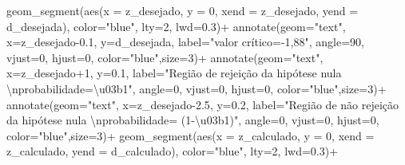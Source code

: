 \documentclass[
]{book}
\newenvironment{Shaded}{\begin{snugshade}}{\end{snugshade}}
\newcommand{\AttributeTok}[1]{\textcolor[rgb]{0.77,0.63,0.00}{#1}}
\newcommand{\DecValTok}[1]{\textcolor[rgb]{0.00,0.00,0.81}{#1}}
\newcommand{\FloatTok}[1]{\textcolor[rgb]{0.00,0.00,0.81}{#1}}
\newcommand{\FunctionTok}[1]{\textcolor[rgb]{0.00,0.00,0.00}{#1}}
\newcommand{\NormalTok}[1]{#1}
\newcommand{\SpecialCharTok}[1]{\textcolor[rgb]{0.00,0.00,0.00}{#1}}
\newcommand{\StringTok}[1]{\textcolor[rgb]{0.31,0.60,0.02}{#1}}
\begin{document}
\begin{Shaded}
\begin{Highlighting}[]
\FunctionTok{geom\_segment}\NormalTok{(}\FunctionTok{aes}\NormalTok{(}\AttributeTok{x =}\NormalTok{ z\_desejado, }\AttributeTok{y =} \DecValTok{0}\NormalTok{, }\AttributeTok{xend =}\NormalTok{ z\_desejado, }\AttributeTok{yend =}\NormalTok{ d\_desejada), }\AttributeTok{color=}\StringTok{"blue"}\NormalTok{, }\AttributeTok{lty=}\DecValTok{2}\NormalTok{, }\AttributeTok{lwd=}\FloatTok{0.3}\NormalTok{)}\SpecialCharTok{+}
\FunctionTok{annotate}\NormalTok{(}\AttributeTok{geom=}\StringTok{"text"}\NormalTok{, }\AttributeTok{x=}\NormalTok{z\_desejado}\FloatTok{{-}0.1}\NormalTok{, }\AttributeTok{y=}\NormalTok{d\_desejada, }\AttributeTok{label=}\StringTok{"valor crítico={-}1,88"}\NormalTok{, }\AttributeTok{angle=}\DecValTok{90}\NormalTok{, }\AttributeTok{vjust=}\DecValTok{0}\NormalTok{, }\AttributeTok{hjust=}\DecValTok{0}\NormalTok{, }\AttributeTok{color=}\StringTok{"blue"}\NormalTok{,}\AttributeTok{size=}\DecValTok{3}\NormalTok{)}\SpecialCharTok{+}
\FunctionTok{annotate}\NormalTok{(}\AttributeTok{geom=}\StringTok{"text"}\NormalTok{, }\AttributeTok{x=}\NormalTok{z\_desejado}\SpecialCharTok{+}\DecValTok{1}\NormalTok{, }\AttributeTok{y=}\FloatTok{0.1}\NormalTok{, }\AttributeTok{label=}\StringTok{"Região de rejeição da hipótese nula }\SpecialCharTok{\textbackslash{}n}\StringTok{probabilidade=\textbackslash{}u03b1"}\NormalTok{, }\AttributeTok{angle=}\DecValTok{0}\NormalTok{, }\AttributeTok{vjust=}\DecValTok{0}\NormalTok{, }\AttributeTok{hjust=}\DecValTok{0}\NormalTok{, }\AttributeTok{color=}\StringTok{"blue"}\NormalTok{,}\AttributeTok{size=}\DecValTok{3}\NormalTok{)}\SpecialCharTok{+}
\FunctionTok{annotate}\NormalTok{(}\AttributeTok{geom=}\StringTok{"text"}\NormalTok{, }\AttributeTok{x=}\NormalTok{z\_desejado}\FloatTok{{-}2.5}\NormalTok{, }\AttributeTok{y=}\FloatTok{0.2}\NormalTok{, }\AttributeTok{label=}\StringTok{"Região de não rejeição da hipótese nula  }\SpecialCharTok{\textbackslash{}n}\StringTok{probabilidade= (1{-}\textbackslash{}u03b1)"}\NormalTok{, }\AttributeTok{angle=}\DecValTok{0}\NormalTok{, }\AttributeTok{vjust=}\DecValTok{0}\NormalTok{, }\AttributeTok{hjust=}\DecValTok{0}\NormalTok{, }\AttributeTok{color=}\StringTok{"blue"}\NormalTok{,}\AttributeTok{size=}\DecValTok{3}\NormalTok{)}\SpecialCharTok{+}
  \FunctionTok{geom\_segment}\NormalTok{(}\FunctionTok{aes}\NormalTok{(}\AttributeTok{x =}\NormalTok{ z\_calculado, }\AttributeTok{y =} \DecValTok{0}\NormalTok{, }\AttributeTok{xend =}\NormalTok{ z\_calculado, }\AttributeTok{yend =}\NormalTok{ d\_calculado), }\AttributeTok{color=}\StringTok{"blue"}\NormalTok{, }\AttributeTok{lty=}\DecValTok{2}\NormalTok{, }\AttributeTok{lwd=}\FloatTok{0.3}\NormalTok{)}\SpecialCharTok{+}

\end{Highlighting}
\end{Shaded}
\end{document}
